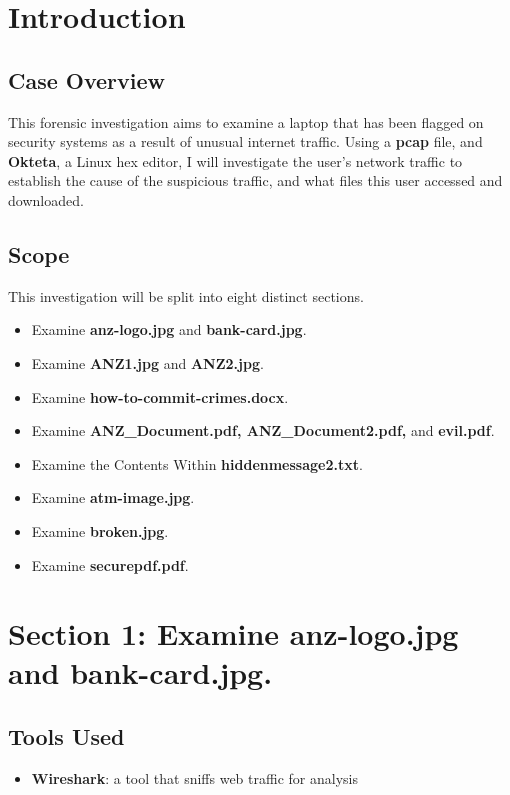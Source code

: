 \section{Introduction}
\subsection{Case Overview}
This forensic investigation aims to examine a laptop that has been flagged on security systems as a result of unusual internet traffic. Using a \textbf{pcap} file, and \textbf{Okteta}, a Linux hex editor, I will investigate the user's network traffic to establish the cause of the suspicious traffic, and what files this user accessed and downloaded.

\subsection{Scope}
This investigation will be split into eight distinct sections.
\begin{itemize}
    \item Examine \textbf{anz-logo.jpg} and \textbf{bank-card.jpg}.
    \item Examine \textbf{ANZ1.jpg} and \textbf{ANZ2.jpg}.
    \item Examine \textbf{how-to-commit-crimes.docx}.
    \item Examine \textbf{ANZ\_Document.pdf, ANZ\_Document2.pdf,} and \textbf{evil.pdf}.
    \item Examine the Contents Within \textbf{hiddenmessage2.txt}.
    \item Examine \textbf{atm-image.jpg}.
    \item Examine \textbf{broken.jpg}.
    \item Examine \textbf{securepdf.pdf}.
\end{itemize}

\section{Section 1: Examine \textbf{anz-logo.jpg} and \textbf{bank-card.jpg}.}
\subsection{Tools Used}
\begin{itemize}
    \item \textbf{Wireshark}: a tool that sniffs web traffic for analysis
\end{itemize}

